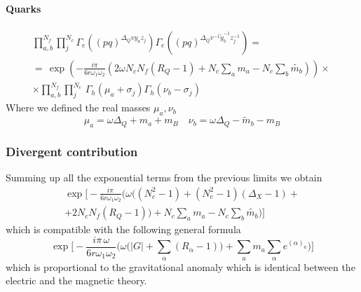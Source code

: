 \paragraph{Quarks}

\begin{multline}
\prod_{a,b}^{N_f} \prod_{j}^{N_c}
\Gamma_e\left(
(pq)^{\Delta_Q v y_a z_j }\right) 
\Gamma_e\left(
(pq)^{\Delta_Q v^{-1} \tilde{y}_b^{-1} z_j^{-1} } \right)  = \\
=\, \exp \left( {- \frac{i \pi} {6 r \omega_1 \omega_2 }  ( 2 \omega N_c N_f  (R_Q - 1) + N_c \sum_a m_a - N_c \sum_b \tilde {m_b} )} \right) \times  \, 
\\
\times
\prod_{a,b}^{N_f} \prod_{j}^{N_c}
 \, \Gamma_h ( \mu_a + \sigma_j) \Gamma_h ( \nu_b- \sigma_j)
\end{multline}
Where we defined the real masses $\mu_a,\nu_b$
\begin{equation}
 \mu_a = \omega \Delta_Q + m_a + m_B  \quad  \nu_b = \omega \Delta_Q - \tilde m_b - m_B
\end{equation}

\subsubsection{Divergent contribution}
Summing up all the exponential terms from the previous limits we obtain
\begin{multline}
 \exp 
 \biggl[
 -\frac{i \pi\,  } {6 r \omega_1 \omega_2 }   
 \biggl(
 \omega \biggl(   (N_c^2 -1) +  (N_c^2 - 1) (\Delta_X -1) + \\ 
   + 2  N_c N_f  (R_Q - 1) \biggr) 
    + N_c \sum_a m_a - N_c \sum_b \tilde {m_b} \biggr)
\biggr]
\end{multline}
which is compatible with the following general formula \cite{Aharony:2013dha}
\begin{equation}
 \exp 
 \biggl[
 -\frac{i \pi\,  \omega} {6 r \omega_1 \omega_2 }   
 \biggl(
 \omega \biggl(
  |G| + \sum_{\alpha}(R_{ \alpha} -1 ) 
  \biggr)
   + \sum_a m_a \sum_{\alpha} e^{(\alpha)_a}
 \biggr)
\biggl]
\end{equation}
which is proportional to the gravitational anomaly \cite{Aharony:2013dha}
which is identical between the electric and the magnetic theory.


